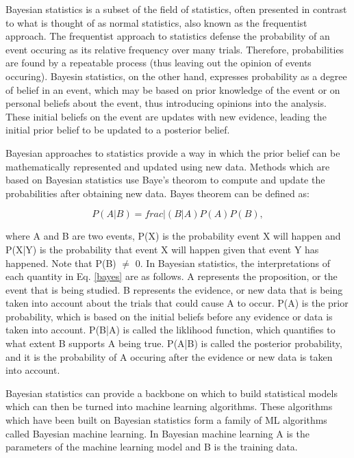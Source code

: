 Bayesian statistics is a subset of the field of statistics, often presented in contrast to what is thought of as normal statistics, also known as the frequentist approach.  The frequentist approach to statistics defense the probability of an event occuring as its relative frequency over many trials.  Therefore, probabilities are found by a repeatable process (thus leaving out the opinion of events occuring).  Bayesin statistics, on the other hand, expresses probability as a degree of belief in an event, which may be based on prior knowledge of the event or on personal beliefs about the event, thus introducing opinions into the analysis.  These initial beliefs on the event are updates with new evidence, leading the initial prior belief to be updated to a posterior belief.

Bayesian approaches to statistics provide a way in which the prior belief can be mathematically represented and updated using new data. Methods which are based on Bayesian statistics use Baye's theorom to compute and update the probabilities after obtaining new data.  Bayes theorem can be defined as:

\begin{equation}\label{bayes}
	P(A|B) = frac{|(B|A)P(A)}{P(B)},
\end{equation}

where A and B are two events, P(X) is the probability event X will happen and P(X|Y) is the probability that event X will happen given that event Y has happened.  Note that P(B) $\neq$ 0.  In Bayesian statistics, the interpretations of each quantity in Eq. \ref{bayes} are as follows.  A represents the proposition, or the event that is being studied.  B represents the evidence, or new data that is being taken into account about the trials that could cause A to occur. P(A) is the prior probability, which is based on the initial beliefs before any evidence or data is taken into account.  P(B|A) is called the liklihood function, which quantifies to what extent B supports A being true.  P(A|B) is called the posterior probability, and it is the probability of A occuring after the evidence or new data is taken into account. 

Bayesian statistics can provide a backbone on which to build statistical models which can then be turned into machine learning algorithms.  These algorithms which have been built on Bayesian statistics form a family of ML algorithms called Bayesian machine learning.  In Bayesian machine learning A is the parameters of the machine learning model and B is the training data.

